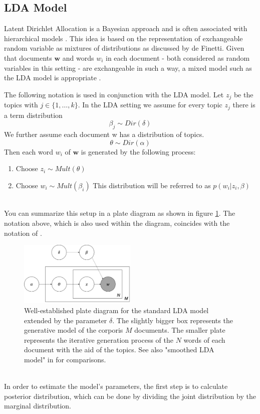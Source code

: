\documentclass[11pt,a4paper]{article}
\begin{document}
\subsection{LDA Model}\label{sec:LDA}

Latent Dirichlet Allocation is a Bayesian approach and is often associated with hierarchical models \cite{Gelman2014}. This idea is based on the representation of exchangeable random variable as mixtures of distributions as discussed by de Finetti.  Given that documents $\textbf{w}$ and words $w_i$ in each document - both considered as random variables in this setting - are exchangeable in such a way, a mixed model such as the LDA model is appropriate \cite{Blei2003}.

The following notation is used in conjunction with the LDA model. Let $z_j$ be the topics with $j\in\{1,\dots,k\}$. In the LDA setting we assume for  every topic $z_j$ there is a term distribution
$$\beta_j \sim Dir(\delta)$$
We further assume each document w has a distribution of topics.
$$\theta \sim Dir(\alpha)$$
Then each word $w_i$ of $\textbf{w}$ is generated by the following process:

\begin{enumerate}
	\item Choose $z_i \sim Mult(\theta)$
	
	\item Choose $w_i \sim Mult(\beta_i)$ This distribution will be referred to as $p(w_i|z_i,\beta)$
\end{enumerate}
\ \\
You can summarize this setup in a plate diagram as shown in figure \ref{fig:PlateDiagram}. The notation above, which is also used within the diagram, coincides with the notation of \cite{Hornik2011}.\\


\begin{figure}[h]
	\centering
	\includegraphics[width=0.5\textwidth]{LDA_Plate_Diagram.png}
	\caption{Well-established plate diagram for the standard LDA model extended by the parameter $\delta$. The slightly bigger box represents the generative model of the corporis $M$ documents. The smaller plate represents the iterative generation process of the $N$ words of each document with the aid of the topics. See also "smoothed LDA model" in \cite{Blei2003}  for comparisons.}
	\label{fig:PlateDiagram}
\end{figure}
\ \\
In order to estimate the model's parameters, the first step is to calculate posterior distribution, which can be done by dividing the joint distribution by the marginal distribution.
\end{document}
